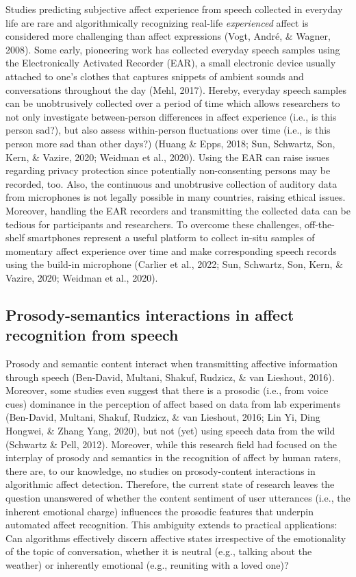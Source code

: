\documentclass[
  english,
  man,floatsintext]{apa6}
\begin{document}
Studies predicting subjective affect experience from speech collected in everyday life are rare and algorithmically recognizing real-life \emph{experienced} affect is considered more challenging than affect expressions (Vogt, André, \& Wagner, 2008). Some early, pioneering work has collected everyday speech samples using the Electronically Activated Recorder (EAR), a small electronic device usually attached to one's clothes that captures snippets of ambient sounds and conversations throughout the day (Mehl, 2017). Hereby, everyday speech samples can be unobtrusively collected over a period of time which allows researchers to not only investigate between-person differences in affect experience (i.e., is this person sad?), but also assess within-person fluctuations over time (i.e., is this person more sad than other days?) (Huang \& Epps, 2018; Sun, Schwartz, Son, Kern, \& Vazire, 2020; Weidman et al., 2020). Using the EAR can raise issues regarding privacy protection since potentially non-consenting persons may be recorded, too. Also, the continuous and unobtrusive collection of auditory data from microphones is not legally possible in many countries, raising ethical issues. Moreover, handling the EAR recorders and transmitting the collected data can be tedious for participants and researchers. To overcome these challenges, off-the-shelf smartphones represent a useful platform to collect in-situ samples of momentary affect experience over time and make corresponding speech records using the build-in microphone (Carlier et al., 2022; Sun, Schwartz, Son, Kern, \& Vazire, 2020; Weidman et al., 2020).

\hypertarget{prosody-semantics-interactions-in-affect-recognition-from-speech}{%
\subsection{Prosody-semantics interactions in affect recognition from speech}\label{prosody-semantics-interactions-in-affect-recognition-from-speech}}

Prosody and semantic content interact when transmitting affective information through speech (Ben-David, Multani, Shakuf, Rudzicz, \& van Lieshout, 2016). Moreover, some studies even suggest that there is a prosodic (i.e., from voice cues) dominance in the perception of affect based on data from lab experiments (Ben-David, Multani, Shakuf, Rudzicz, \& van Lieshout, 2016; Lin Yi, Ding Hongwei, \& Zhang Yang, 2020), but not (yet) using speech data from the wild (Schwartz \& Pell, 2012). Moreover, while this research field had focused on the interplay of prosody and semantics in the recognition of affect by human raters, there are, to our knowledge, no studies on prosody-content interactions in algorithmic affect detection. Therefore, the current state of research leaves the question unanswered of whether the content sentiment of user utterances (i.e., the inherent emotional charge) influences the prosodic features that underpin automated affect recognition. This ambiguity extends to practical applications: Can algorithms effectively discern affective states irrespective of the emotionality of the topic of conversation, whether it is neutral (e.g., talking about the weather) or inherently emotional (e.g., reuniting with a loved one)?
\end{document}

